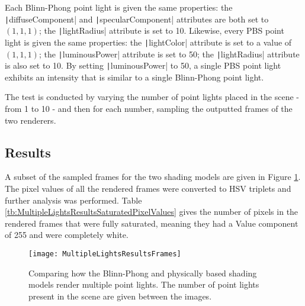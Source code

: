 Each Blinn-Phong point light is given the same properties: the \texttt|diffuseComponent| and \texttt|specularComponent| attributes are both set to \begin{math}(1, 1, 1)\end{math}; the \texttt|lightRadius| attribute is set to 10. Likewise, every PBS point light is given the same properties: the \texttt|lightColor| attribute is set to a value of \begin{math}(1, 1, 1)\end{math}; the \texttt|luminousPower| attribute is set to 50; the \texttt|lightRadius| attribute is also set to 10. By setting \texttt|luminousPower| to 50, a single PBS point light exhibits an intensity that is similar to a single Blinn-Phong point light.

The test is conducted by varying the number of point lights placed in the scene - from 1 to 10 - and then for each number, sampling the outputted frames of the two renderers.

\subsection{Results}

A subset of the sampled frames for the two shading models are given in Figure \ref{fig:MultipleLightsResultsFrames}. The pixel values of all the rendered frames were converted to HSV triplets and further analysis was performed. Table \ref{tb:MultipleLightsResultsSaturatedPixelValues} gives the number of pixels in the rendered frames that were fully saturated, meaning they had a Value component of 255 and were completely white.

\begin{figure}[h]
	\centering
	\texttt{[image: MultipleLightsResultsFrames]}
	\caption{Comparing how the Blinn-Phong and physically based shading models render multiple point lights. The number of point lights present in the scene are given between the images.}
	\label{fig:MultipleLightsResultsFrames}
\end{figure}

